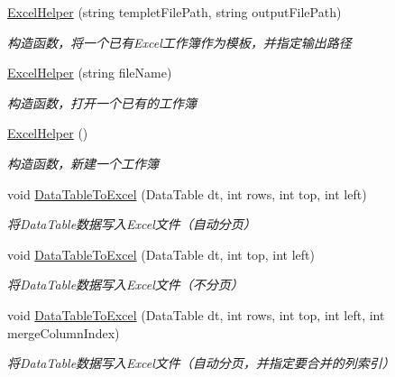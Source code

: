 \begin{DoxyCompactItemize}
\item 
\hyperlink{class_x_c_l_net_tools_1_1_office_1_1_excel_handler_1_1_excel_helper_a12c422938f2054941e10baa671676383}{Excel\+Helper} (string templet\+File\+Path, string output\+File\+Path)
\begin{DoxyCompactList}\small\item\em 构造函数，将一个已有\+Excel工作簿作为模板，并指定输出路径 \end{DoxyCompactList}\item 
\hyperlink{class_x_c_l_net_tools_1_1_office_1_1_excel_handler_1_1_excel_helper_a92dad5cbd48287b013aa81ca90d02fb6}{Excel\+Helper} (string file\+Name)
\begin{DoxyCompactList}\small\item\em 构造函数，打开一个已有的工作簿 \end{DoxyCompactList}\item 
\hyperlink{class_x_c_l_net_tools_1_1_office_1_1_excel_handler_1_1_excel_helper_ab7738aab96d5a2ebc7d5c8a72899edf1}{Excel\+Helper} ()
\begin{DoxyCompactList}\small\item\em 构造函数，新建一个工作簿 \end{DoxyCompactList}\item 
void \hyperlink{class_x_c_l_net_tools_1_1_office_1_1_excel_handler_1_1_excel_helper_aff2b9ad2316d2acf6908da2929b5a103}{Data\+Table\+To\+Excel} (Data\+Table dt, int rows, int top, int left)
\begin{DoxyCompactList}\small\item\em 将\+Data\+Table数据写入\+Excel文件（自动分页） \end{DoxyCompactList}\item 
void \hyperlink{class_x_c_l_net_tools_1_1_office_1_1_excel_handler_1_1_excel_helper_ad8dc84e458463633d1027acdfadc5d2c}{Data\+Table\+To\+Excel} (Data\+Table dt, int top, int left)
\begin{DoxyCompactList}\small\item\em 将\+Data\+Table数据写入\+Excel文件（不分页） \end{DoxyCompactList}\item 
void \hyperlink{class_x_c_l_net_tools_1_1_office_1_1_excel_handler_1_1_excel_helper_a0d9c977adcc92c1e57560f1d713f74be}{Data\+Table\+To\+Excel} (Data\+Table dt, int rows, int top, int left, int merge\+Column\+Index)
\begin{DoxyCompactList}\small\item\em 将\+Data\+Table数据写入\+Excel文件（自动分页，并指定要合并的列索引） \end{DoxyCompactList}\item 

\end{DoxyCompactItemize}
